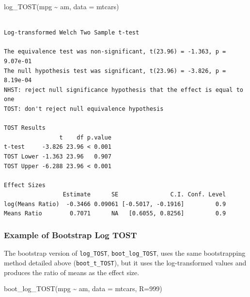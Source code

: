 \documentclass[
]{interact}
\newenvironment{Shaded}{\begin{snugshade}}{\end{snugshade}}
\newcommand{\AttributeTok}[1]{\textcolor[rgb]{0.40,0.45,0.13}{#1}}
\newcommand{\DecValTok}[1]{\textcolor[rgb]{0.68,0.00,0.00}{#1}}
\newcommand{\FunctionTok}[1]{\textcolor[rgb]{0.28,0.35,0.67}{#1}}
\newcommand{\NormalTok}[1]{\textcolor[rgb]{0.00,0.23,0.31}{#1}}
\newcommand{\SpecialCharTok}[1]{\textcolor[rgb]{0.37,0.37,0.37}{#1}}
\begin{document}
\begin{Shaded}
\begin{Highlighting}[]
\FunctionTok{log\_TOST}\NormalTok{(mpg }\SpecialCharTok{\textasciitilde{}}\NormalTok{ am, }\AttributeTok{data =}\NormalTok{ mtcars)}
\end{Highlighting}
\end{Shaded}

\begin{verbatim}

Log-transformed Welch Two Sample t-test

The equivalence test was non-significant, t(23.96) = -1.363, p = 9.07e-01
The null hypothesis test was significant, t(23.96) = -3.826, p = 8.19e-04
NHST: reject null significance hypothesis that the effect is equal to one 
TOST: don't reject null equivalence hypothesis

TOST Results 
                t    df p.value
t-test     -3.826 23.96 < 0.001
TOST Lower -1.363 23.96   0.907
TOST Upper -6.288 23.96 < 0.001

Effect Sizes 
                 Estimate      SE               C.I. Conf. Level
log(Means Ratio)  -0.3466 0.09061 [-0.5017, -0.1916]         0.9
Means Ratio        0.7071      NA   [0.6055, 0.8256]         0.9
\end{verbatim}

\newpage

\hypertarget{example-of-bootstrap-log-tost}{%
\subsubsection{Example of Bootstrap Log
TOST}\label{example-of-bootstrap-log-tost}}

The bootstrap version of \texttt{log\_TOST}, \texttt{boot\_log\_TOST},
uses the same bootstrapping method detailed above
(\texttt{boot\_t\_TOST}), but it uses the log-transformed values and
produces the ratio of means as the effect size.

\begin{Shaded}
\begin{Highlighting}[]
\FunctionTok{boot\_log\_TOST}\NormalTok{(mpg }\SpecialCharTok{\textasciitilde{}}\NormalTok{ am, }\AttributeTok{data =}\NormalTok{ mtcars, }\AttributeTok{R=}\DecValTok{999}\NormalTok{)}
\end{Highlighting}
\end{Shaded}
\end{document}

